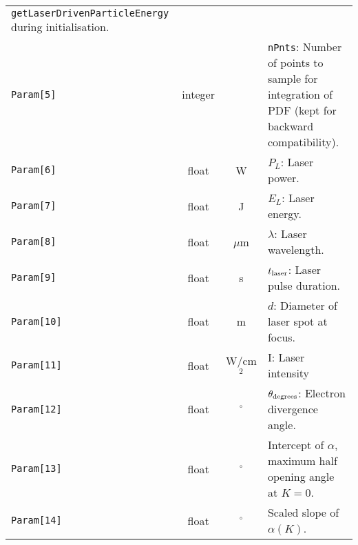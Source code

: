 \begin{table}[h]
\begin{center}
\begin{tabular}{|l|c|c|p{10cm}|}
                                                \texttt{getLaserDrivenParticleEnergy} during initialisation.                    \\
       \texttt{Param[5]} & integer &          & \texttt{nPnts}: Number of points to sample for integration of PDF (kept for
                                                backward compatibility).                                                        \\
       \texttt{Param[6]} & float   & W        & $P_L$: Laser power.                                                             \\
       \texttt{Param[7]} & float   & J        & $E_L$: Laser energy.                                                            \\
       \texttt{Param[8]} & float   & $\mu$m   & $\lambda$: Laser wavelength.                                                     \\
       \texttt{Param[9]} & float   & s        & $t_{\rm laser}$: Laser pulse duration.                                            \\
      \texttt{Param[10]} & float   & m        & $d$: Diameter of laser spot at focus.                                           \\
      \texttt{Param[11]} & float   & W/cm$^2$ & I: Laser intensity                                                              \\
      \texttt{Param[12]} & float   & $^\circ$ & $\theta_{\rm degrees}$: Electron divergence angle.                                \\
      \texttt{Param[13]} & float   & $^\circ$ & Intercept of $\alpha$, maximum half opening angle at $K=0$.                      \\
      \texttt{Param[14]} & float   & $^\circ$ & Scaled slope of $\alpha(K)$.                                                     \\
      \hline
    \end{tabular}
  \end{center}
\end{table}
